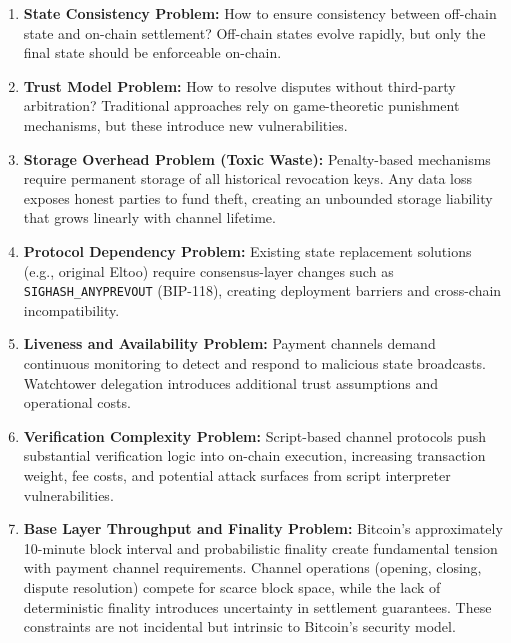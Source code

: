 \documentclass[11pt,a4paper]{article}
\begin{document}
\begin{enumerate}
    \item \textbf{State Consistency Problem:} How to ensure consistency between off-chain state and on-chain settlement? Off-chain states evolve rapidly, but only the final state should be enforceable on-chain.
    
    \item \textbf{Trust Model Problem:} How to resolve disputes without third-party arbitration? Traditional approaches rely on game-theoretic punishment mechanisms, but these introduce new vulnerabilities.
    
    \item \textbf{Storage Overhead Problem (Toxic Waste):} Penalty-based mechanisms require permanent storage of all historical revocation keys. Any data loss exposes honest parties to fund theft, creating an unbounded storage liability that grows linearly with channel lifetime.
    
    \item \textbf{Protocol Dependency Problem:} Existing state replacement solutions (e.g., original Eltoo) require consensus-layer changes such as \texttt{SIGHASH\_ANYPREVOUT} (BIP-118), creating deployment barriers and cross-chain incompatibility.
    
    \item \textbf{Liveness and Availability Problem:} Payment channels demand continuous monitoring to detect and respond to malicious state broadcasts. Watchtower delegation introduces additional trust assumptions and operational costs.
    
    \item \textbf{Verification Complexity Problem:} Script-based channel protocols push substantial verification logic into on-chain execution, increasing transaction weight, fee costs, and potential attack surfaces from script interpreter vulnerabilities.
    
    \item \textbf{Base Layer Throughput and Finality Problem:} Bitcoin's approximately 10-minute block interval and probabilistic finality create fundamental tension with payment channel requirements. Channel operations (opening, closing, dispute resolution) compete for scarce block space, while the lack of deterministic finality introduces uncertainty in settlement guarantees. These constraints are not incidental but intrinsic to Bitcoin's security model.
\end{enumerate}
\end{document}
